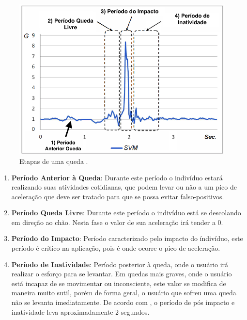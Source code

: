 \begin{figure}[ht]
	\centering
	\includegraphics[width=.8\textwidth]{imagens/fall_states.png}
	\caption{Etapas de uma queda \citep{hsieh2014wrist}.}
	\label{fig:fall_states}
\end{figure} 


\begin{enumerate}

	
	\item{\textbf{Período Anterior à Queda}: Durante este período o indivíduo estará realizando suas atividades cotidianas, que podem levar ou não a um pico de aceleração que deve ser tratado para que se possa evitar falso-positivos. }
	
	\item{\textbf{Período Queda Livre}: Durante este período o indivíduo está se descolando em direção ao chão. Nesta fase o valor de sua aceleração irá tender a 0.  }
	
	\item{\textbf{Período do Impacto}: Período caracterizado pelo impacto do índivíduo, este período é crítico na aplicação, pois é onde ocorre o pico de aceleração. }
	
	\item{\textbf{Período de Inatividade}: Período posterior à queda, onde o usuário irá realizar o esforço para se levantar. Em quedas mais graves, onde o usuário está incapaz de se movimentar ou inconsciente, este valor se modifica de maneira muito sutil, porém de forma geral, o usuário que sofreu uma queda não se levanta imediatamente. De acordo com \cite{mehner2013location}, o período de pós impacto e inatividade leva aproximadamente 2 segundos.  }
	
\end{enumerate}


